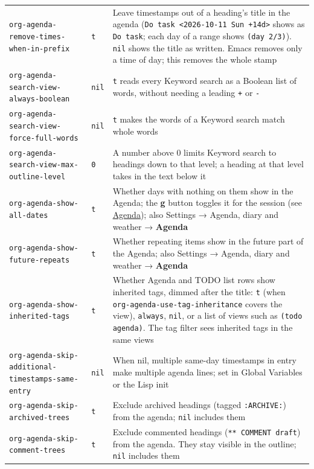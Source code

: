 \documentclass[11pt]{article}
\begin{document}
\begin{center}
\begin{tabular}{lll}
\texttt{org-agenda-remove-times-when-in-prefix} & \texttt{t} & Leave timestamps out of a heading's title in the agenda (\texttt{Do task <2026-10-11 Sun +14d>} shows as \texttt{Do task}; each day of a range shows \texttt{(day 2/3)}). \texttt{nil} shows the title as written. Emacs removes only a time of day; this removes the whole stamp\\[0pt]
\texttt{org-agenda-search-view-always-boolean} & \texttt{nil} & \texttt{t} reads every Keyword search as a Boolean list of words, without needing a leading \texttt{+} or \texttt{-}\\[0pt]
\texttt{org-agenda-search-view-force-full-words} & \texttt{nil} & \texttt{t} makes the words of a Keyword search match whole words\\[0pt]
\texttt{org-agenda-search-view-max-outline-level} & \texttt{0} & A number above 0 limits Keyword search to headings down to that level; a heading at that level takes in the text below it\\[0pt]
\texttt{org-agenda-show-all-dates} & \texttt{t} & Whether days with nothing on them show in the Agenda; the \textbf{g} button toggles it for the session (see \hyperref[sec:org38ac5a3]{Agenda}); also Settings → Agenda, diary and weather → \textbf{Agenda}\\[0pt]
\texttt{org-agenda-show-future-repeats} & \texttt{t} & Whether repeating items show in the future part of the Agenda; also Settings → Agenda, diary and weather → \textbf{Agenda}\\[0pt]
\texttt{org-agenda-show-inherited-tags} & \texttt{t} & Whether Agenda and TODO list rows show inherited tags, dimmed after the title: \texttt{t} (when \texttt{org-agenda-use-tag-inheritance} covers the view), \texttt{always}, \texttt{nil}, or a list of views such as \texttt{(todo agenda)}. The tag filter sees inherited tags in the same views\\[0pt]
\texttt{org-agenda-skip-additional-timestamps-same-entry} & \texttt{nil} & When nil, multiple same-day timestamps in entry make multiple agenda lines; set in Global Variables or the Lisp init\\[0pt]
\texttt{org-agenda-skip-archived-trees} & \texttt{t} & Exclude archived headings (tagged \texttt{:ARCHIVE:}) from the agenda; \texttt{nil} includes them\\[0pt]
\texttt{org-agenda-skip-comment-trees} & \texttt{t} & Exclude commented headings (\texttt{** COMMENT draft}) from the agenda. They stay visible in the outline; \texttt{nil} includes them\\[0pt]

\end{tabular}
\end{center}
\end{document}
